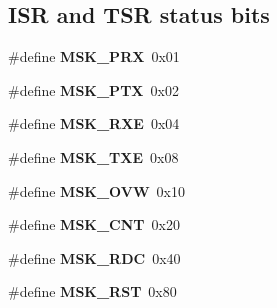 \subsection*{I\+SR and T\+SR status bits}
\begin{DoxyCompactItemize}
\item 
\mbox{\label{group__gumstix__dp8390_gaff1af0f20de83b1dea8f0983eb18af57}} 
\#define {\bfseries M\+S\+K\+\_\+\+P\+RX}~0x01
\item 
\mbox{\label{group__gumstix__dp8390_ga41f04c63c208a04967193c22d7dacd5e}} 
\#define {\bfseries M\+S\+K\+\_\+\+P\+TX}~0x02
\item 
\mbox{\label{group__gumstix__dp8390_gaa2bd026c16b29c00554474d80d1dd372}} 
\#define {\bfseries M\+S\+K\+\_\+\+R\+XE}~0x04
\item 
\mbox{\label{group__gumstix__dp8390_ga15f3b4347f1c3cbce9fcb7c5bb46f828}} 
\#define {\bfseries M\+S\+K\+\_\+\+T\+XE}~0x08
\item 
\mbox{\label{group__gumstix__dp8390_ga0946320fdd4cbfa60f9f793a81c86db3}} 
\#define {\bfseries M\+S\+K\+\_\+\+O\+VW}~0x10
\item 
\mbox{\label{group__gumstix__dp8390_gae42f925bdf1a6106ccdabaa951b29622}} 
\#define {\bfseries M\+S\+K\+\_\+\+C\+NT}~0x20
\item 
\mbox{\label{group__gumstix__dp8390_gaf800c1ba9366c02bb8f24941f597682b}} 
\#define {\bfseries M\+S\+K\+\_\+\+R\+DC}~0x40
\item 
\mbox{\label{group__gumstix__dp8390_ga5f7f251fc046204e1af584ce646b29f7}} 
\#define {\bfseries M\+S\+K\+\_\+\+R\+ST}~0x80
\end{DoxyCompactItemize}
